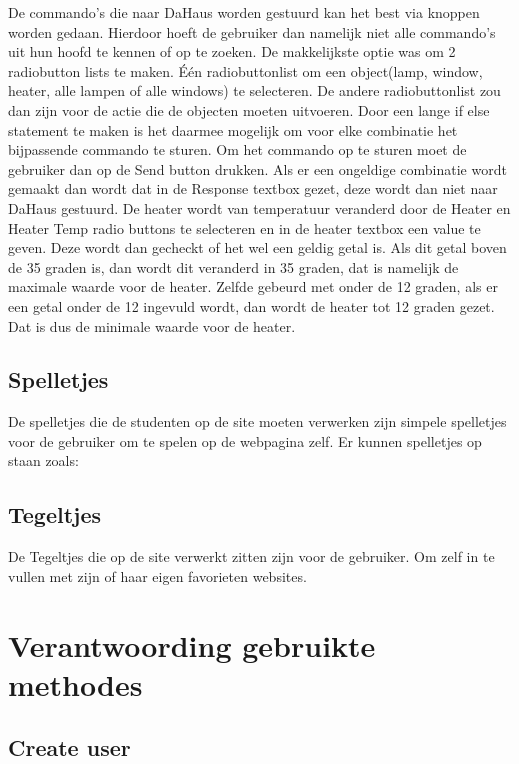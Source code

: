 \documentclass[11pt]{article}
\begin{document}
	De commando's die naar DaHaus worden gestuurd kan het best via knoppen worden gedaan. Hierdoor hoeft de gebruiker dan namelijk niet alle commando's uit hun hoofd te kennen of op te zoeken. De makkelijkste optie was om 2 radiobutton lists te maken. \'{E}\'{e}n radiobuttonlist om een object(lamp, window, heater, alle lampen of alle windows) te selecteren. De andere radiobuttonlist zou dan zijn voor de actie die de objecten moeten uitvoeren. Door een lange if else statement te maken is het daarmee mogelijk om voor elke combinatie het bijpassende commando te sturen. Om het commando op te sturen moet de gebruiker dan op de Send button drukken. Als er een ongeldige combinatie wordt gemaakt dan wordt dat in de Response textbox gezet, deze wordt dan niet naar DaHaus gestuurd. De heater wordt van temperatuur veranderd door de Heater en Heater Temp radio buttons te selecteren en in de heater textbox een value te geven. Deze wordt dan gecheckt of het wel een geldig getal is. Als dit getal boven de 35 graden is, dan wordt dit veranderd in 35 graden, dat is namelijk de maximale waarde voor de heater. Zelfde gebeurd met onder de 12 graden, als er een getal onder de 12 ingevuld wordt, dan wordt de heater tot 12 graden gezet. Dat is dus de minimale waarde voor de heater. 
	\subsection{Spelletjes}
	De spelletjes die de studenten op de site moeten verwerken zijn simpele spelletjes voor de gebruiker om te spelen op de webpagina zelf. Er kunnen spelletjes op staan zoals: 
	\subsection{Tegeltjes}
	De Tegeltjes die op de site verwerkt zitten zijn voor de gebruiker. Om zelf in te vullen met zijn of haar eigen favorieten websites.
	\newpage
	
	\section{Verantwoording gebruikte methodes}
	\subsection{Create user}
	
\end{document}
